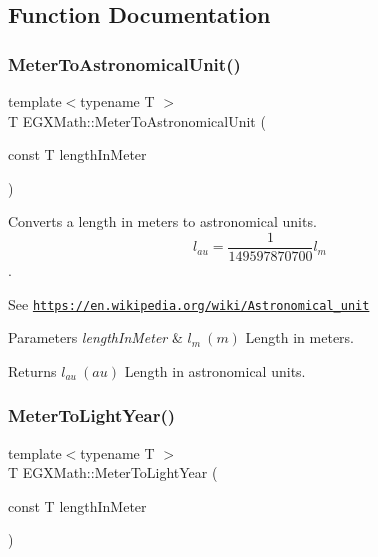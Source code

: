 \subsection{Function Documentation}
\mbox{\label{group___e_g_x_math-_conversions-_length_conversions-_s_i-_meter-_astronomical_gadf1e5c63bba613fab5b94704df71994d}} 
\subsubsection{\texorpdfstring{Meter\+To\+Astronomical\+Unit()}{MeterToAstronomicalUnit()}}
{\footnotesize\ttfamily template$<$typename T $>$ \\
T E\+G\+X\+Math\+::\+Meter\+To\+Astronomical\+Unit (\begin{DoxyParamCaption}\item[{const T}]{length\+In\+Meter }\end{DoxyParamCaption})}



Converts a length in meters to astronomical units. \[ l_{au}= \frac{1}{149597870700} l_{m} \]. 

See \href{https://en.wikipedia.org/wiki/Astronomical_unit}{\tt https\+://en.\+wikipedia.\+org/wiki/\+Astronomical\+\_\+unit} 
\begin{DoxyParams}{Parameters}
{\em length\+In\+Meter} & $ l_{m}\ (m)$ Length in meters. \\
\hline
\end{DoxyParams}
\begin{DoxyReturn}{Returns}
$ l_{au}\ (au)$ Length in astronomical units. 
\end{DoxyReturn}
\mbox{\label{group___e_g_x_math-_conversions-_length_conversions-_s_i-_meter-_astronomical_ga0dbb6d8e5d002475c0335934326b27d7}} 
\subsubsection{\texorpdfstring{Meter\+To\+Light\+Year()}{MeterToLightYear()}}
{\footnotesize\ttfamily template$<$typename T $>$ \\
T E\+G\+X\+Math\+::\+Meter\+To\+Light\+Year (\begin{DoxyParamCaption}\item[{const T}]{length\+In\+Meter }\end{DoxyParamCaption})}



